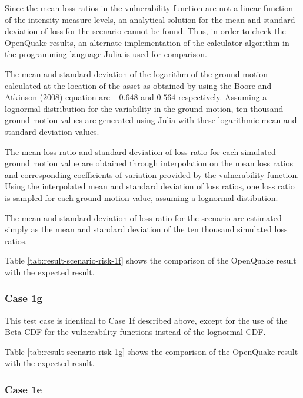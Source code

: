 Since the mean loss ratios in the vulnerability function are not a linear function of the intensity measure levels, an analytical solution for the mean and standard deviation of loss for the scenario cannot be found. Thus, in order to check the OpenQuake results, an alternate implementation of the calculator algorithm in the programming language Julia is used for comparison.

The mean and standard deviation of the logarithm of the ground motion calculated at the location of the asset as obtained by using the Boore and Atkinson (2008) equation are $-0.648$ and $0.564$ respectively. Assuming a lognormal distribution for the variability in the ground motion, ten thousand ground motion values are generated using Julia with these logarithmic mean and standard deviation values.

The mean loss ratio and standard deviation of loss ratio for each simulated ground motion value are obtained through interpolation on the mean loss ratios and corresponding coefficients of variation provided by the vulnerability function. Using the interpolated mean and standard deviation of loss ratios, one loss ratio is sampled for each ground motion value, assuming a lognormal distibution.

The mean and standard deviation of loss ratio for the scenario are estimated simply as the mean and standard deviation of the ten thousand simulated loss ratios.



Table \ref{tab:result-scenario-risk-1f} shows the comparison of the OpenQuake result with the expected result.

\subsubsection{Case 1g}
This test case is identical to Case 1f described above, except for the use of the Beta CDF for the vulnerability functions instead of the lognormal CDF.



Table \ref{tab:result-scenario-risk-1g} shows the comparison of the OpenQuake result with the expected result.

\subsubsection{Case 1e}


